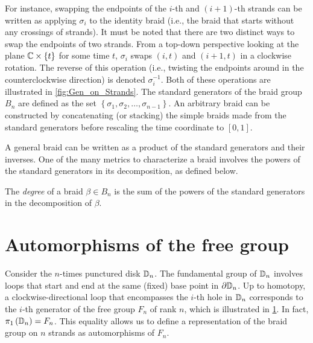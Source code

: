 For instance, swapping the endpoints of the $i$-th and $(i+1)$-th strands can be written as applying $\sigma_i$ to the identity braid (i.e., the braid that starts without any crossings of strands). It must be noted that there are two distinct ways to swap the endpoints of two strands. From a top-down perspective looking at the plane $\mathbb{C}\times\left\{ t \right\}$ for some time $t$, $\sigma_i$ swaps $(i,t)$ and $(i+1,t)$ in a clockwise rotation. The reverse of this operation (i.e., twisting the endpoints around in the counterclockwise direction) is denoted $\sigma_i^{-1}$. Both of these operations are illustrated in \cref{fig:Gen_on_Strands}. The standard generators of the braid group $B_n$ are defined as the set $\left\{ \sigma_1,\sigma_2,\dots,\sigma_{n-1} \right\}$. An arbitrary braid can be constructed by concatenating (or stacking) the simple braids made from the standard generators before rescaling the time coordinate to $[0,1]$.

A general braid can be written as a product of the standard generators and their inverses. One of the many metrics to characterize a braid involves the powers of the standard generators in its decomposition, as defined below.
\begin{definition}
    The \textit{degree} of a braid $\beta\in B_n$ is the sum of the powers of the standard generators in the decomposition of $\beta$.
\end{definition}

\section{Automorphisms of the free group}\label{sec:Aut_Fn}

Consider the $n$-times punctured disk $\mathbb{D}_n$. The fundamental group of $\mathbb{D}_n$ involves loops that start and end at the same (fixed) base point in $\partial\mathbb{D}_n$. Up to homotopy, a clockwise-directional loop that encompasses the $i$-th hole in $\mathbb{D}_n$ corresponds to the $i$-th generator of the free group $F_n$ of rank $n$, which is illustrated in \cref{fig:Gen_on_Dn}. In fact, $\pi_1\left( \mathbb{D}_n \right) = F_n$. This equality allows us to define a representation of the braid group on $n$ strands as automorphisms of $F_n$.

\begin{figure}[htbp]
    \centering
    
    \label{fig:Gen_on_Dn}
\end{figure}

